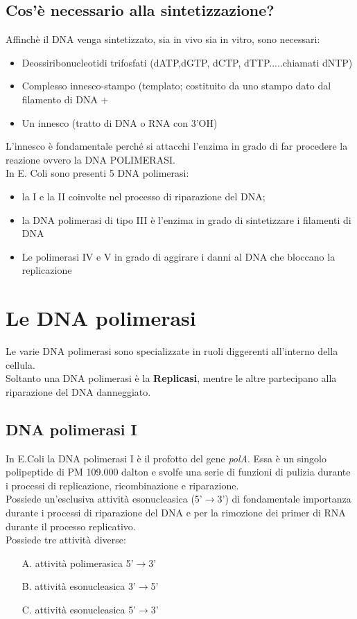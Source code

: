 \documentclass{article}
\begin{document}
\subsection{Cos'è necessario alla sintetizzazione?} Affinchè il DNA venga sintetizzato, sia in vivo sia in vitro, sono necessari:
\begin{itemize}
    \item Deossiribonucleotidi trifosfati (dATP,dGTP, dCTP, dTTP.....chiamati dNTP)
    \item Complesso innesco-stampo (templato; costituito da uno stampo dato
dal filamento di DNA +
    \item Un innesco (tratto di DNA o RNA con 3'OH)
\end{itemize}
L'innesco è fondamentale perché si attacchi l'enzima in grado di far procedere la reazione ovvero la DNA POLIMERASI.\\
In E. Coli sono presenti 5 DNA polimerasi:
\begin{itemize}
    \item la I e la II coinvolte nel processo di riparazione del DNA;
    \item la DNA polimerasi di tipo III è l'enzima in grado di sintetizzare i filamenti di DNA
    \item Le polimerasi IV e V in grado di aggirare i danni al DNA che bloccano la replicazione
\end{itemize}
\section{Le DNA polimerasi}
Le varie DNA polimerasi sono specializzate in ruoli diggerenti all'interno della cellula.\\Soltanto una DNA polimerasi è la \textbf{Replicasi}, mentre le altre partecipano alla riparazione del DNA danneggiato.
\subsection{DNA polimerasi I} In E.Coli la DNA polimerasi I è il profotto del gene \textit{polA}. Essa è un singolo polipeptide di PM 109.000 dalton e svolfe una serie di funzioni di pulizia durante i processi di replicazione, ricombinazione e riparazione.\\ Possiede un'esclusiva attività esonucleasica (5'$\rightarrow$3') di fondamentale importanza durante i processi di riparazione del DNA e per la rimozione dei primer di RNA durante il processo replicativo.\\Possiede tre attività diverse:
\begin{enumerate}
    \item [A.] attività polimerasica 5'$\rightarrow$3'
    \item [B.] attività esonucleasica 3'$\rightarrow$5'
    \item [C.] attività esonucleasica 5'$\rightarrow$3'
\end{enumerate}
\end{document}
